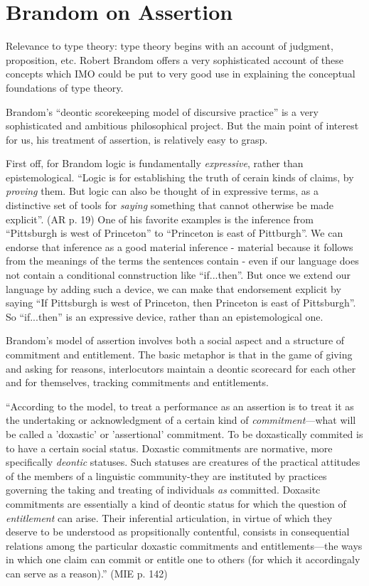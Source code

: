 \section{Brandom on Assertion}

\begin{remark}
  Relevance to type theory: type theory begins with an account of
  judgment, proposition, etc.  Robert Brandom offers a very
  sophisticated account of these concepts which IMO could be put to
  very good use in explaining the conceptual foundations of type
  theory.
\end{remark}

Brandom's ``deontic scorekeeping model of discursive practice'' is a
very sophisticated and ambitious philosophical project.  But the main
point of interest for us, his treatment of assertion, is relatively
easy to grasp.

First off, for Brandom logic is fundamentally \textit{expressive},
rather than epistemological.  ``Logic is for establishing the truth of
cerain kinds of claims, by \textit{proving} them.  But logic can also
be thought of in expressive terms, as a distinctive set of tools for
\textit{saying} something that cannot otherwise be made
explicit''. (AR p. 19) One of his favorite examples is the inference
from ``Pittsburgh is west of Princeton'' to ``Princeton is east of
Pittburgh''.  We can endorse that inference as a good material
inference - material because it follows from the meanings of the terms
the sentences contain - even if our language does not contain a
conditional connstruction like ``if...then''.  But once we extend our
language by adding such a device, we can make that endorsement
explicit by saying ``If Pittsburgh is west of Princeton, then
Princeton is east of Pittsburgh''.  So ``if...then'' is an expressive
device, rather than an epistemological one.

Brandom's model of assertion involves both a
social aspect and a structure of commitment and entitlement.  The
basic metaphor is that in the game of giving and asking for reasons,
interlocutors maintain a deontic scorecard for each other and for
themselves, tracking commitments and entitlements.

``According to the model, to treat a performance as an assertion is to
treat it as the undertaking or acknowledgment of a certain kind of
\textit{commitment}---what will be called a 'doxastic' or 'assertional'
commitment.  To be doxastically commited is to have a certain social
status.  Doxastic commitments are normative, more specifically
\textit{deontic} statuses.  Such statuses are creatures of the
practical attitudes of the members of a linguistic community-they are
instituted by practices governing the taking and treating of
individuals \textit{as} committed.  Doxasitc commitments are
essentially a kind of deontic status for which the question of
\textit{entitlement} can arise.  Their inferential articulation, in
virtue of which they deserve to be understood as propsitionally
contentful, consists in consequential relations among the particular
doxastic commitments and entitlements---the ways in which one claim can
commit or entitle one to others (for which it accordingaly can serve
as a reason).''  (MIE p. 142)

